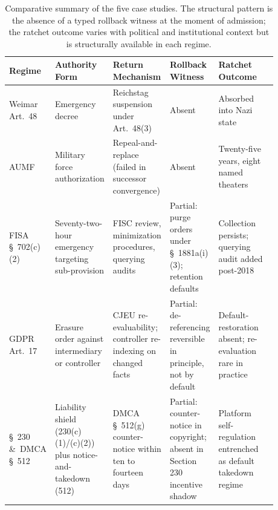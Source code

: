 \begin{table}[h]
\centering
\caption{Comparative summary of the five case studies. The structural pattern is the absence of a typed rollback witness at the moment of admission; the ratchet outcome varies with political and institutional context but is structurally available in each regime.}
\label{tab:cases}
\small
\begin{tabular}{@{}p{0.13\linewidth}p{0.18\linewidth}p{0.20\linewidth}p{0.15\linewidth}p{0.22\linewidth}@{}}
\toprule
Regime & Authority Form & Return Mechanism & Rollback Witness & Ratchet Outcome \\
\midrule
Weimar Art.~48 & Emergency decree & Reichstag suspension under Art.~48(3) & Absent & Absorbed into Nazi state \\
\addlinespace
2001 AUMF & Military force authorization & Repeal-and-replace (failed in successor convergence) & Absent & Twenty-five years, eight named theaters \\
\addlinespace
FISA \S~702(c)(2) & Seventy-two-hour emergency targeting sub-provision & FISC review, minimization procedures, querying audits & Partial: purge orders under \S~1881a(i)(3); retention defaults & Collection persists; querying audit added post-2018 \\
\addlinespace
GDPR Art.~17 & Erasure order against intermediary or controller & CJEU re-evaluability; controller re-indexing on changed facts & Partial: de-referencing reversible in principle, not by default & Default-restoration absent; re-evaluation rare in practice \\
\addlinespace
\S~230 \&\ DMCA \S~512 & Liability shield (230(c)(1)/(c)(2)) plus notice-and-takedown (512) & DMCA \S~512(g) counter-notice within ten to fourteen days & Partial: counter-notice in copyright; absent in Section 230 incentive shadow & Platform self-regulation entrenched as default takedown regime \\
\bottomrule
\end{tabular}
\end{table}
